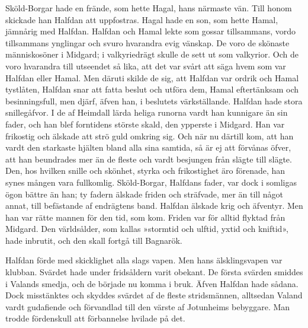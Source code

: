 Sköld-Borgar hade en frände, som hette Hagal, hans närmaste vän. Till
honom skickade han Halfdan att uppfostras. Hagal hade en son, som hette
Hamal, jämnårig med Halfdan. Halfdan och Hamal lekte som gossar
tillsammans, vordo tillsammans ynglingar och svuro hvarandra evig
vänskap. De voro de skönaste människosöner i Midgard; i valkyriedrägt
skulle de sett ut som valkyrior. Och de voro hvarandra till utseendet så
lika, att det var svårt att säga hvem som var Halfdan eller Hamal. Men
däruti skilde de sig, att Halfdan var ordrik och Hamal tystlåten,
Halfdan snar att fatta beslut och utföra dem, Hamal eftertänksam och
besinningsfull, men djärf, äfven han, i beslutets värkställande. Halfdan
hade stora snillegåfvor. I de af Heimdall lärda heliga runorna vardt han
kunnigare än sin fader, och han blef forntidens störste skald, den
ypperste i Midgard. Han var frikostig och älskade att strö guld omkring
sig. Och när nu därtill kom, att han vardt den starkaste hjälten bland
alla sina samtida, så är ej att förvånas öfver, att han beundrades mer
än de fleste och vardt besjungen från slägte till slägte. Den, hos
hvilken snille och skönhet, styrka och frikostighet äro förenade, han
synes mången vara fullkomlig. Sköld-Borgar, Halfdans fader, var dock i
somligas ögon bättre än han; ty fadern älskade friden och sträfvade, mer
än till något annat, till befästande af endrägtens band. Halfdan älskade
krig och äfventyr. Men han var rätte mannen för den tid, som kom. Friden
var för alltid flyktad från Midgard. Den världsålder, som kallas
»stormtid och ulftid, yxtid och kniftid», hade inbrutit, och den skall
fortgå till Bagnarök.

Halfdan förde med skicklighet alla slags vapen. Men hans älsklingsvapen
var klubban. Svärdet hade under fridsåldern varit obekant. De första
svärden smiddes i Valands smedja, och de började nu komma i bruk. Äfven
Halfdan hade sådana. Dock misstänktes och skyddes svärdet af de fleste
stridsmännen, alltsedan Valand vardt gudafiende och förvandlad till den
värste af Jotunheims bebyggare. Man trodde fördenskull att förbannelse
hvilade på det.

